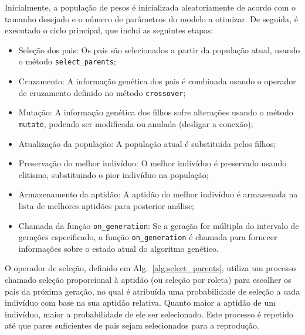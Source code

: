 Inicialmente, a população de pesos é inicializada aleatoriamente de acordo com o tamanho desejado e o número de parâmetros do modelo a otimizar.
De seguida, é executado o ciclo principal, que inclui as seguintes etapas:
\begin{itemize}
    \item Seleção dos pais: Os pais são selecionados a partir da população atual, usando o método \texttt{select\_parents};
    \item Cruzamento: A informação genética dos pais é combinada usando o operador de cruzamento definido no método \texttt{crossover};
    \item Mutação: A informação genética dos filhos sofre alterações usando o método \texttt{mutate}, podendo ser modificada ou anulada (desligar a conexão);
    \item Atualização da população: A população atual é substituída pelos filhos;
    \item Preservação do melhor indivíduo: O melhor indivíduo é preservado usando elitismo, substituindo o pior indivíduo na população;
    \item Armazenamento da aptidão: A aptidão do melhor indivíduo é armazenada na lista de melhores aptidões para posterior análise;
    \item Chamada da função \texttt{on\_generation}: Se a geração for múltipla do intervalo de gerações especificado, a função \texttt{on\_generation} é chamada para fornecer informações sobre o estado atual do algoritmo genético.
\end{itemize}

O operador de seleção, definido em Alg.~\ref{alg:select_parents}, utiliza um processo chamado seleção proporcional à aptidão (ou seleção por roleta) para escolher os pais da próxima geração, no qual é atribuída uma probabilidade de seleção a cada indivíduo com base na sua aptidão relativa.
Quanto maior a aptidão de um indivíduo, maior a probabilidade de ele ser selecionado.
Este processo é repetido até que pares suficientes de pais sejam selecionados para a reprodução.

